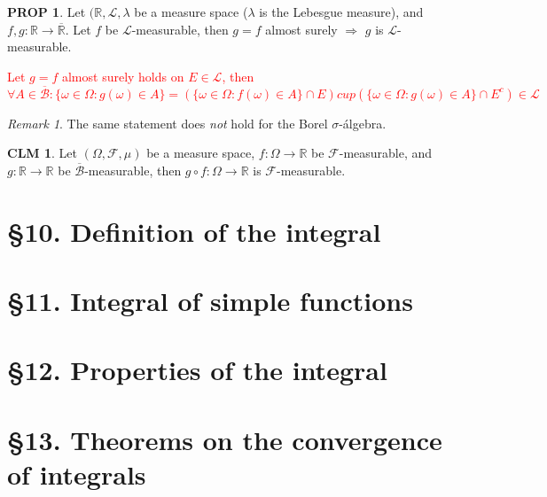 \documentclass[hidelinks]{article}
\theoremstyle{definition}
\theoremstyle{dotless}
\newtheorem{proposition}{PROP}[section]
\newtheorem{claim}{CLM}[section]
\theoremstyle{remark}
\newtheorem*{remark}{Remark}
\begin{document}
\begin{proposition}
Let $(\mathbb{R},\mathscr{L},\lambda$ be a measure space ($\lambda$ is the Lebesgue measure), and $f,g:\mathbb{R}\to\overline{\mathbb{R}}$. Let $f$ be $\mathscr{L}$-measurable, then $g=f$ almost surely $\Rightarrow$ $g$ is $\mathscr{L}$-measurable.
\end{proposition}
\textcolor{red}{Let $g=f$ almost surely holds on $E\in\mathscr{L}$, then
\[\forall A\in\overline{\mathscr{B}}:\{\omega\in\Omega:g(\omega)\in A\}=(\{\omega\in\Omega:f(\omega)\in A\}\cap E)cup(\{\omega\in\Omega:g(\omega)\in A\}\cap E^c)\in\mathscr{L}\]}

\begin{remark}
The same statement does \emph{not} hold for the Borel $\sigma$-álgebra.
\end{remark}

\begin{claim}
Let $(\Omega,\mathscr{F},\mu)$ be a measure space, $f:\Omega\to\mathbb{R}$ be $\mathscr{F}$-measurable, and $g:\mathbb{R}\to\mathbb{R}$ be $\overline{\mathscr{B}}$-measurable, then $g\circ f:\Omega\to\mathbb{R}$ is $\mathscr{F}$-measurable.
\end{claim}

\bigbreak

\section*{\S10. Definition of the integral}
\setcounter{section}{10}

\bigbreak

\section*{\S11. Integral of simple functions}
\setcounter{section}{11}

\bigbreak

\section*{\S12. Properties of the integral}
\setcounter{section}{12}

\bigbreak

\section*{\S13. Theorems on the convergence of integrals}
\setcounter{section}{13}
\end{document}
